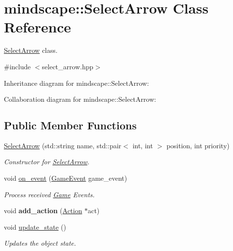 \hypertarget{classmindscape_1_1_select_arrow}{}\section{mindscape\+:\+:Select\+Arrow Class Reference}
\label{classmindscape_1_1_select_arrow}


\hyperlink{classmindscape_1_1_select_arrow}{Select\+Arrow} class.  




{\ttfamily \#include $<$select\+\_\+arrow.\+hpp$>$}



Inheritance diagram for mindscape\+:\+:Select\+Arrow\+:


Collaboration diagram for mindscape\+:\+:Select\+Arrow\+:
\subsection*{Public Member Functions}
\begin{DoxyCompactItemize}
\item 
\hyperlink{classmindscape_1_1_select_arrow_ad6b1089e4898188b678b0f443781ced4}{Select\+Arrow} (std\+::string name, std\+::pair$<$ int, int $>$ position, int priority)
\begin{DoxyCompactList}\small\item\em Constructor for \hyperlink{classmindscape_1_1_select_arrow}{Select\+Arrow}. \end{DoxyCompactList}\item 
void \hyperlink{classmindscape_1_1_select_arrow_aa9087f1fd52219fd23ad2cbdf717ca69}{on\+\_\+event} (\hyperlink{class_game_event}{Game\+Event} game\+\_\+event)
\begin{DoxyCompactList}\small\item\em Process received \hyperlink{class_game}{Game} Events. \end{DoxyCompactList}\item 
void {\bfseries add\+\_\+action} (\hyperlink{classmindscape_1_1_action}{Action} $\ast$act)\hypertarget{classmindscape_1_1_select_arrow_ab5cb745951fc1522112f4586b66a0c96}{}\label{classmindscape_1_1_select_arrow_ab5cb745951fc1522112f4586b66a0c96}

\item 
void \hyperlink{classmindscape_1_1_select_arrow_a25e2956765898f2e9273df5704fe5973}{update\+\_\+state} ()
\begin{DoxyCompactList}\small\item\em Updates the object state. \end{DoxyCompactList}\end{DoxyCompactItemize}
